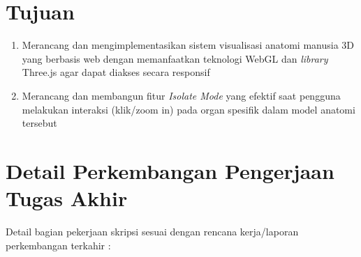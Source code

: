 \documentclass[a4paper,twoside]{article}
\begin{document}
    
\section{Tujuan}
    \begin{enumerate}
        \item Merancang dan mengimplementasikan sistem visualisasi anatomi manusia 3D yang berbasis web dengan memanfaatkan teknologi WebGL dan \textit{library} Three.js agar dapat diakses secara responsif
        \item Merancang dan membangun fitur \textit{Isolate Mode} yang efektif saat pengguna melakukan interaksi (klik/zoom in) pada organ spesifik dalam model anatomi tersebut 
    \end{enumerate}

\section{Detail Perkembangan Pengerjaan Tugas Akhir}
Detail bagian pekerjaan skripsi sesuai dengan rencana kerja/laporan perkembangan terkahir : 
\end{document}
